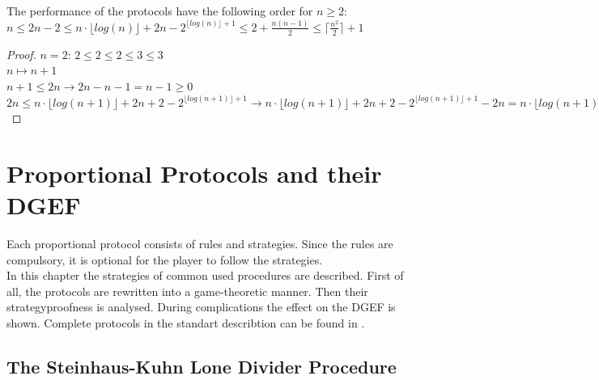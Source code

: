 \begin{corollary}
The performance of the protocols have the following order for $n\geq 2$:\\
$n \leq 2n-2 \leq n\cdot \lfloor log (n)\rfloor +2n-2^{\lfloor log (n)\rfloor +1} \leq 2 + \frac{n(n-1)}{2} \leq \lceil \frac{n^2}{2} \rceil + 1$
\end{corollary}

\begin{proof}
$n=2$: $2 \leq 2 \leq 2 \leq 3 \leq 3$\\
$n \mapsto n+1$ \\$n+1 \leq 2n \rightarrow 2n-n-1=n-1 \geq 0$\\
$2n \leq n\cdot \lfloor log (n+1)\rfloor +2n+2-2^{\lfloor log (n+1)\rfloor +1} \rightarrow n\cdot \lfloor log (n+1)\rfloor +2n+2-2^{\lfloor log (n+1)\rfloor +1}-2n=n\cdot \lfloor log (n+1)\rfloor-2^{\lfloor log (n+1)\rfloor} \geq 0$
\end{proof}
\pagebreak

\section{Proportional Protocols and their DGEF}
Each proportional protocol consists of rules and strategies. Since the rules are compulsory, it is optional for the player to follow the strategies.\\
In this chapter the strategies of common used procedures are described. First of all, the protocols are rewritten into a game-theoretic manner. Then their strategyproofness is analysed. During complications the effect on the DGEF is shown. Complete protocols in the standart describtion can be found in \cite{robertson:cake-cutting}.
\subsection{The Steinhaus-Kuhn Lone Divider Procedure}

\newpage
